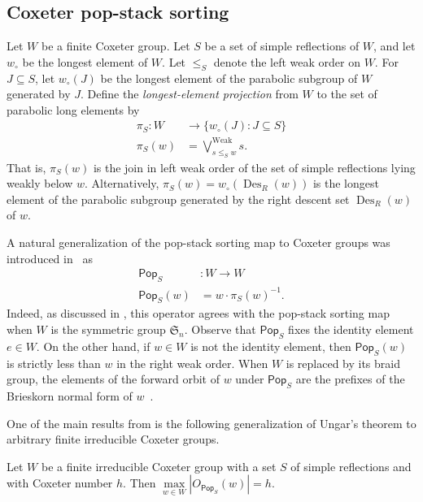 \documentclass[ALCO,ThmDefs,Unicode,epreuves]{cedram}
\newcommand{\darkblue}{\color{darkblue}}
\newcommand{\defn}[1]{\emph{\darkblue #1}}
\newcommand{\pop}{\mathsf{Pop}}
\newcommand{\wo}{w_\circ}
\DeclareMathOperator{\Des}{Des}
\DeclareMathOperator{\Weak}{Weak}
\begin{document}
\subsection{Coxeter pop-stack sorting}
Let $W$ be a finite Coxeter group. Let $S$ be a set of simple reflections of $W$, and let $\wo$ be the longest element of $W$.  Let $\leq_S$ denote the left weak order on $W$. For $J\subseteq S$, let $\wo(J)$ be the longest element of the parabolic subgroup of $W$ generated by $J$. Define the \defn{longest-element projection} from $W$ to the set of parabolic long elements by
\begin{align}
\pi_S:W &\to \big\{\wo(J) : J \subseteq S \big\} \nonumber\\
\pi_S(w)&=\bigvee_{s \leq_S w}^{\Weak} s.
\end{align}
That is, $\pi_S(w)$ is the join in left weak order of the set of simple reflections lying weakly below $w$. Alternatively, $\pi_S(w)=\wo(\Des_R(w))$ is the longest element of the parabolic subgroup generated by the right descent set $\Des_R(w)$ of $w$. 


A natural generalization of the pop-stack sorting map to Coxeter groups was introduced in~\cite{defant2021stack} as 
\begin{align}
\pop_S&:W\to W \nonumber\\
\pop_S(w) &= w \cdot \pi_S(w)^{-1}.
\label{eq:pops}
\end{align} Indeed, as discussed in \cite{defant2021stack}, this operator agrees with the pop-stack sorting map when $W$ is the symmetric group $\mathfrak S_n$. Observe that $\pop_S$ fixes the identity element $e\in W$. On the other hand, if $w\in W$ is not the identity element, then $\pop_S(w)$ is strictly less than $w$ in the right weak order.  When $W$ is replaced by its braid group, the elements of the forward orbit of $w$ under $\pop_S$ are the prefixes of the Brieskorn normal form of $w$~\cite{brieskorn1971fundamentalgruppe,brieskorn1972artin}.

One of the main results from \cite{defant2021stack} is the following generalization of Ungar's theorem to arbitrary finite irreducible Coxeter groups. 

\begin{theorem}\label{ColinThm}
Let $W$ be a finite irreducible Coxeter group with a set $S$ of simple reflections and with Coxeter number $h$. Then $\max\limits_{w\in W}\left|O_{\pop_S}(w)\right|=h$.
\end{theorem}
\end{document}
